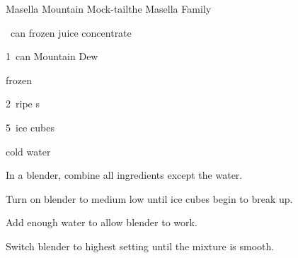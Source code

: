 \begin{recipe}{Masella Mountain Mock-tail}{the Masella Family}{}

\begin{ingredients}
\item \half~can frozen  juice concentrate
\item 1~can Mountain Dew
\item \C{\half} frozen 
\item 2~ripe s
\item 5~ice cubes
\item cold water
\end{ingredients}

\begin{directions}
\item In a blender, combine all ingredients except the water.
\item Turn on blender to medium low until ice cubes begin to break up.
\item Add enough water to allow blender to work.
\item Switch blender to highest setting until the mixture is smooth.
\end{directions}

\end{recipe}
